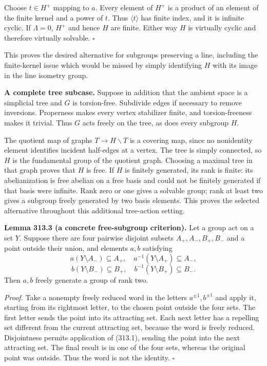 \documentclass[11pt]{article}
\begin{document}
Choose $t\in H^+$ mapping to $a$. Every element of $H^+$ is a product of an element of the finite kernel and a power of $t$. Thus $\langle t\rangle$ has finite index, and it is infinite cyclic. If $\Lambda=0$, $H^+$ and hence $H$ are finite. Either way $H$ is virtually cyclic and therefore virtually solvable. $\square$

This proves the desired alternative for subgroups preserving a line, including the finite-kernel issue which would be missed by simply identifying $H$ with its image in the line isometry group.

\textbf{A complete tree subcase.} Suppose in addition that the ambient space is a simplicial tree and $G$ is torsion-free. Subdivide edges if necessary to remove inversions. Properness makes every vertex stabilizer finite, and torsion-freeness makes it trivial. Thus $G$ acts freely on the tree, as does every subgroup $H$.

The quotient map of graphs $T\to H\backslash T$ is a covering map, since no nonidentity element identifies incident half-edges at a vertex. The tree is simply connected, so $H$ is the fundamental group of the quotient graph. Choosing a maximal tree in that graph proves that $H$ is free. If $H$ is finitely generated, its rank is finite: its abelianization is free abelian on a free basis and could not be finitely generated if that basis were infinite. Rank zero or one gives a solvable group; rank at least two gives a subgroup freely generated by two basis elements. This proves the selected alternative throughout this additional tree-action setting.

\textbf{Lemma 313.3 (a concrete free-subgroup criterion).} Let a group act on a set $Y$. Suppose there are four pairwise disjoint subsets $A_+,A_-,B_+,B_-$ and a point outside their union, and elements $a,b$ satisfying
\[
 a(Y\setminus A_-)\subseteq A_+,
 \quad a^{-1}(Y\setminus A_+)\subseteq A_-,
\]
\[
 b(Y\setminus B_-)\subseteq B_+,
 \quad b^{-1}(Y\setminus B_+)\subseteq B_-.
 \tag{313.1}
\]
Then $a,b$ freely generate a group of rank two.

\emph{Proof.} Take a nonempty freely reduced word in the letters $a^{\pm1},b^{\pm1}$ and apply it, starting from its rightmost letter, to the chosen point outside the four sets. The first letter sends the point into its attracting set. Each next letter has a repelling set different from the current attracting set, because the word is freely reduced. Disjointness permits application of (313.1), sending the point into the next attracting set. The final result is in one of the four sets, whereas the original point was outside. Thus the word is not the identity. $\square$
\end{document}
